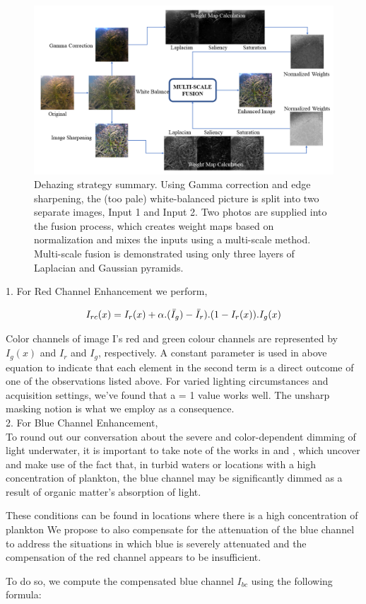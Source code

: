 \documentclass[conference]{IEEEtran}
\begin{document}
\begin{figure}
\includegraphics[width=\textwidth]{7_Overview.png}
\caption{Dehazing strategy summary. Using Gamma correction and edge sharpening, the (too pale) white-balanced picture is split into two separate images, Input 1 and Input 2. Two photos are supplied into the fusion process, which creates weight maps based on normalization and mixes the inputs using a multi-scale method. Multi-scale fusion is demonstrated using only three layers of Laplacian and Gaussian pyramids.}
\end{figure}

1. For Red Channel Enhancement we perform,

\[I_{rc}(x) = I_r(x) + \alpha.(\Bar{I}_g) - \Bar{I}_r) . (1 - I_r(x)).I_g(x)\]

Color channels of image I's red and green colour channels are represented by $I_g(x)$ and $I_r$  and $I_g$, respectively. A constant parameter is used in above equation to indicate that each element in the second term is a direct outcome of one of the observations listed above. For varied lighting circumstances and acquisition settings, we've found that a = 1 value works well. The unsharp masking notion is what we employ as a consequence.\\

2. For Blue Channel Enhancement,\\
To round out our conversation about the severe and color-dependent dimming of light underwater, it is important to take note of the works in \cite{galdran2015automatic} and \cite{lu2015contrast} \cite{lu2016underwater} \cite{bonin2011imaging}, which uncover and make use of the fact that, in turbid waters or locations with a high concentration of plankton, the blue channel may be significantly dimmed as a result of organic matter's absorption of light. 
\par
These conditions can be found in locations where there is a high concentration of plankton We propose to also compensate for the attenuation of the blue channel to address the situations in which blue is severely attenuated and the compensation of the red channel appears to be insufficient.
\par
To do so, we compute the compensated blue channel $I_{bc}$ using the following formula:
\end{document}
